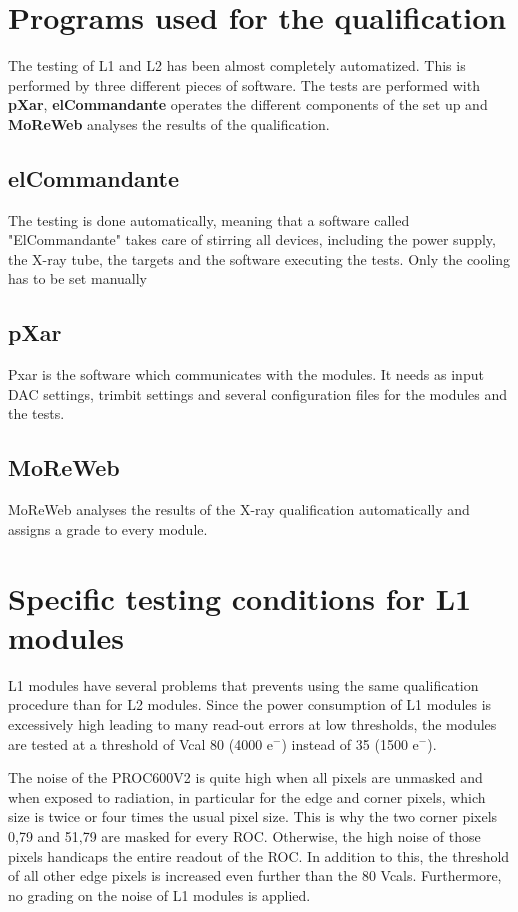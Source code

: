 \documentclass[a4paper,12pt,twoside]{article}
\begin{document}
\section{Programs used for the qualification}

The testing of L1 and L2 has been almost completely automatized. This is performed by three different pieces of software. The tests are performed with \textbf{pXar}, \textbf{elCommandante} operates the different components of the set up and \textbf{MoReWeb} analyses the results of the qualification.

\subsection{elCommandante}

The testing is done automatically, meaning that a software called "ElCommandante" takes care of stirring all devices, including the power supply, the X-ray tube, the targets and the software executing the tests. Only the cooling has to be set manually


\subsection{pXar}
Pxar is the software which communicates with the modules. It needs as input DAC settings, trimbit settings and several configuration files for the modules and the tests.

\subsection{MoReWeb}

MoReWeb analyses the results of the X-ray qualification automatically and assigns a grade to every module.

\section{Specific testing conditions for L1 modules}

L1 modules have several problems that prevents using the same qualification procedure than for L2 modules. Since the power consumption of L1 modules is excessively high leading to many read-out errors at low thresholds, the modules are tested at a threshold of Vcal 80 (4000 e$^-$) instead of 35 (1500 e$^-$). 

The noise of the PROC600V2 is quite high when all pixels are unmasked and when exposed to radiation, in particular for the edge and corner pixels, which size is twice or four times the usual pixel size. This is why the two corner pixels 0,79 and 51,79 are masked for every ROC. Otherwise, the high noise of those pixels handicaps the entire readout of the ROC. In addition to this, the threshold of all other edge pixels is increased even further than the 80 Vcals. Furthermore, no grading on the noise of L1 modules is applied.
\end{document}
